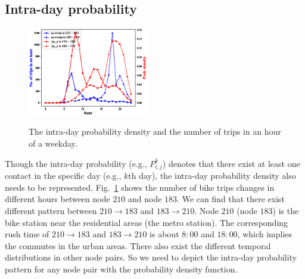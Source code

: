 \subsection{Intra-day probability}
\label{subsec:intra-day}
\begin{figure}
  \centering
  {\includegraphics[width=0.47\textwidth]{fig/intradayprob_p.eps}}
     \caption{The intra-day probability density and the number of trips
     in an hour of a weekday.}
     \label{fig:intradayp}
\end{figure}
Though the intra-day probability (e.g., $P_{i,j}^k$) denotes
that there exist at least one contact in the specific day (e.g., $k$th day),
the intra-day probability density also needs to be represented.
Fig.~\ref{fig:intradayp} shows the number of bike trips changes
in different hours between node $210$ and node $183$.
We can find that there exist different pattern
between $210 \rightarrow 183$ and $183 \rightarrow 210$.
Node $210$ (node $183$) is the bike station
near the residential areas (the metro station).
The corresponding rush time of $210 \rightarrow 183$
and $183 \rightarrow 210$ is about $8:00$ and $18:00$,
which implies the commutes in the urban areas.
There also exist the different temporal distributions
in other node pairs.
So we need to depict the intra-day probability pattern
for any node pair with the probability density function.

